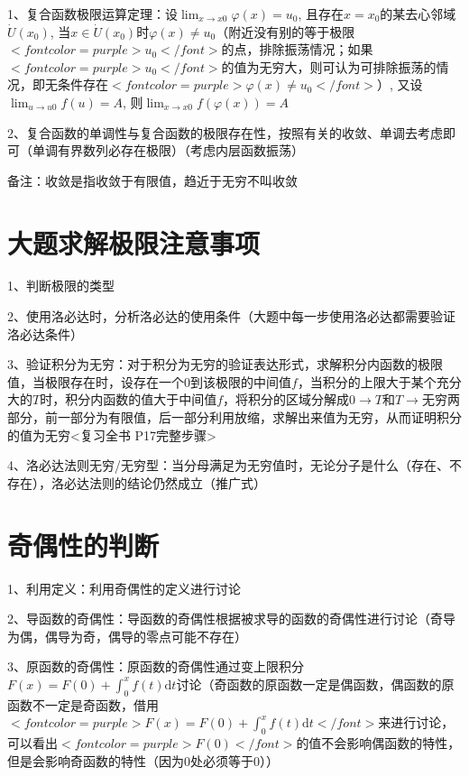 1、复合函数极限运算定理：设$ \lim_{x \rightarrow x{0}} \varphi(x)=u_{0} $, 且存在$ x=x_{0} $的某去心邻域$ \dot{U}\left(x_{0}\right) $, 当$ x \in \dot{U}\left(x_{0}\right) $时$ \varphi(x) \neq u_{0} $（附近没有别的等于极限$ <font color=purple>u_{0}</font> $的点，排除振荡情况；如果$ <font color=purple>u_{0}</font> $的值为无穷大，则可认为可排除振荡的情况，即无条件存在$ <font color=purple>\varphi(x) \neq u_{0}</font> $）, 又设$ \lim_{u \rightarrow u{0}} f(u)=A $, 则$ \lim_{x \rightarrow x{0}} f(\varphi(x))=A $

2、复合函数的单调性与复合函数的极限存在性，按照有关的收敛、单调去考虑即可（单调有界数列必存在极限）（考虑内层函数振荡）

备注：收敛是指收敛于有限值，趋近于无穷不叫收敛

\section{大题求解极限注意事项}

1、判断极限的类型

2、使用洛必达时，分析洛必达的使用条件（大题中每一步使用洛必达都需要验证洛必达条件）

3、验证积分为无穷：对于积分为无穷的验证表达形式，求解积分内函数的极限值，当极限存在时，设存在一个$ 0 $到该极限的中间值$ f $，当积分的上限大于某个充分大的$ T $时，积分内函数的值大于中间值$ f $，将积分的区域分解成$ 0→T $和$ T→无穷 $两部分，前一部分为有限值，后一部分利用放缩，求解出来值为无穷，从而证明积分的值为无穷<复习全书 P17完整步骤>

4、洛必达法则无穷/无穷型：当分母满足为无穷值时，无论分子是什么（存在、不存在），洛必达法则的结论仍然成立（推广式）

\section{奇偶性的判断}

1、利用定义：利用奇偶性的定义进行讨论

2、导函数的奇偶性：导函数的奇偶性根据被求导的函数的奇偶性进行讨论（奇导为偶，偶导为奇，偶导的零点可能不存在）

3、原函数的奇偶性：原函数的奇偶性通过变上限积分$ F(x)=F(0)+\int_{0}^{x} f(t) \mathrm{d} t $讨论（奇函数的原函数一定是偶函数，偶函数的原函数不一定是奇函数，借用$ <font color=purple>F(x)=F(0)+\int_{0}^{x} f(t) \mathrm{d} t</font> $来进行讨论，可以看出$ <font color=purple>F(0)</font> $的值不会影响偶函数的特性，但是会影响奇函数的特性（因为0处必须等于0））

